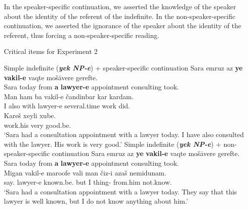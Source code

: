 \documentclass[output=paper]{langsci/langscibook}
\begin{document}
In the speaker-specific continuation, we asserted the knowledge of the speaker about the identity of the referent of the indefinite. In the non-speaker-specific continuation, we asserted the ignorance of the speaker about the identity of the referent, thus forcing a non-speaker-specific reading.

\begin{exe}
\ex\label{4ex:34}
Critical items for Experiment 2 
	\begin{xlista}
	\ex\label{4ex:34a}
	Simple indefinite ({\bf\emph{yek NP-e}}) + speaker-specific continuation
	\exi{}
	\gll	Sara	emruz	az	{\bf{ye}} 	{\bf{vakil-e}}	 	vaqte 		mošāvere	gerefte. \\
		Sara	today	from	{\bf{a}} 	{\bf{lawyer-e}}	 	appointment	consulting 	took.{} \\
	\glt
	\exi{}
	\gll	Man ham ba	vakil-e 	čandinbar  	kar    kardam. \\
		I	also with lawyer-e	several.time work did.{} \\
	\glt
	\exi{}
	\gll	Kareš	xeyli 	xube. \\
		work.his 	very		good.be.{} \\
	\glt `Sara had a consultation appointment with a lawyer today. I have also consulted with the lawyer. His work is very good.'
	\ex\label{4ex:34b}
	Simple indefinite ({\bf\emph{yek NP-e}}) + non-speaker-specific continuation
	\exi{}
	\gll	Sara	emruz az		{\bf{ye}} {\bf{vakil-e}}	 vaqte 	        	mošāvere		gerefte.  \\
		Sara	today	 from		{\bf{a}} {\bf{lawyer-e}} 	appointment 	consulting    	took.{} \\
	\glt
	\exi{}
	\gll	Migan    vakil-e	 maroofe		  vali man čiz-i		  azaš	    nemidunam. \\
		say.{} lawyer-e known.be.{} but	I	   thing-{} from.him not.know.{} \\
	\glt	`{Sara had a consultation appointment with a lawyer today. They say that this lawyer is well known, but I do not know anything about him.}'


\end{xlista}
\end{exe}
\end{document}

